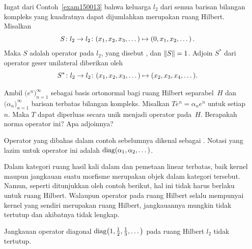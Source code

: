 \begin{exam}\label{C063526} Ingat dari Contoh~\ref{exam150013} bahwa keluarga $l_2$ dari semua
barisan bilangan kompleks yang kuadratnya dapat dijumlahkan merupakan ruang Hilbert. Misalkan
    \[ S\colon l_2 \rightarrow l_2\colon (x_1,x_2,x_3,\dots) \mapsto (0,x_1,x_2,\dots)\,. \]
Maka $S$ adalah operator pada $l_2$, yang disebut
, dan $\lVert S\rVert = 1$. Adjoin $S^*$ dari operator geser
unilateral
diberikan oleh
  \[ S^*\colon l_2 \rightarrow l_2\colon (x_1,x_2,x_3,\dots) \mapsto (x_2,x_3,x_4,\dots). \]
\end{exam}

\begin{exam} Ambil $\bigl(e^n\bigr)_{n=1}^\infty$ sebagai basis ortonormal bagi ruang Hilbert separabel~$H$ dan
$\bigl(\alpha_n\bigr)_{n=1}^\infty$ barisan terbatas bilangan kompleks. Misalkan $Te^n = \alpha_n e^n$ untuk setiap~$n$.
Maka $T$ dapat diperluas secara unik menjadi operator pada~$H$. Berapakah norma operator ini? Apa adjoinnya?
\end{exam}

\begin{defn} Operator yang dibahas dalam contoh sebelumnya dikenal sebagai
. Notasi yang lazim untuk operator ini adalah
$\operatorname{diag}(\alpha_1,\alpha_2,\dots)$.
\end{defn}

Dalam kategori ruang hasil kali dalam dan pemetaan linear terbatas, baik kernel maupun jangkauan suatu morfisme merupakan objek dalam kategori tersebut.
Namun, seperti ditunjukkan oleh contoh berikut, hal ini tidak harus berlaku untuk ruang Hilbert. Walaupun operator pada ruang Hilbert selalu mempunyai kernel
yang sendiri merupakan ruang Hilbert, jangkauannya mungkin tidak tertutup dan akibatnya tidak lengkap.

\begin{exam}\label{exam_ran_nonclosed} Jangkauan operator diagonal $\operatorname{diag}\bigl(1,\frac12,\frac13, \dots\bigr)$ pada
ruang Hilbert $l_2$ tidak tertutup.
\end{exam}

